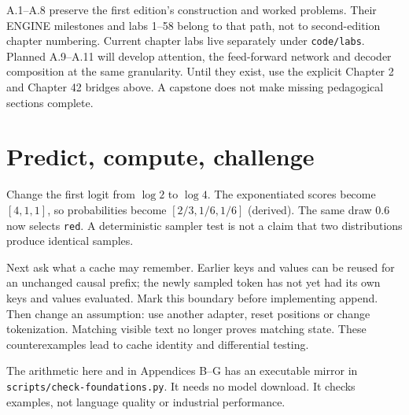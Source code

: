 A.1--A.8 preserve the first edition's construction and worked problems.
Their ENGINE milestones and labs 1--58 belong to that path, not to
second-edition chapter numbering. Current chapter labs live separately
under \texttt{code/labs}. Planned A.9--A.11 will develop attention, the
feed-forward network and decoder composition at the same granularity.
Until they exist, use the explicit Chapter 2 and Chapter 42 bridges above.
A capstone does not make missing pedagogical sections complete.

\section*{Predict, compute, challenge}
Change the first logit from $\log 2$ to $\log 4$. The exponentiated scores
become $[4,1,1]$, so probabilities become $[2/3,1/6,1/6]$ (derived).
The same draw $0.6$ now selects \texttt{red}. A deterministic sampler test
is not a claim that two distributions produce identical samples.

Next ask what a cache may remember. Earlier keys and values can be reused
for an unchanged causal prefix; the newly sampled token has not yet had
its own keys and values evaluated. Mark this boundary before implementing
append. Then change an assumption: use another adapter, reset positions
or change tokenization. Matching visible text no longer proves matching
state. These counterexamples lead to cache identity and differential testing.

The arithmetic here and in Appendices B--G has an executable mirror in
\texttt{scripts/check-foundations.py}. It needs no model download.
It checks examples, not language quality or industrial performance.
